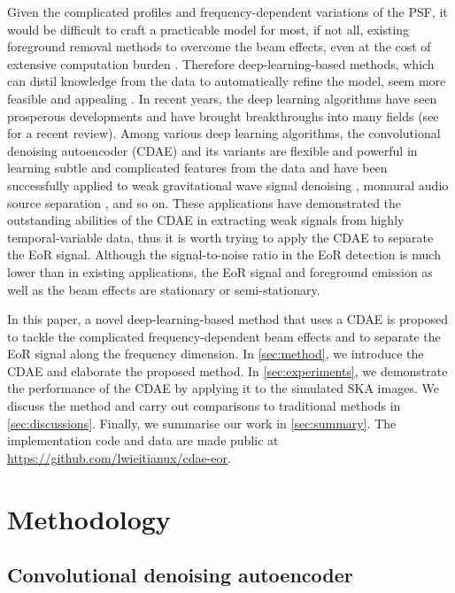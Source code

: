 \documentclass[fleqn,usenatbib]{mnras}
\newcommand{\editone}[1]{{\leavevmode\color{cyan}#1}}
\begin{document}
Given the complicated profiles and frequency-dependent variations of
the PSF, it would be difficult to craft a practicable model for most,
if not all, existing foreground removal methods to overcome the beam
effects, even at the cost of extensive computation burden
\citep[e.g.,][]{lochner2015}.
Therefore deep-learning-based methods, which can distil knowledge from
the data to automatically refine the model, seem more feasible
and appealing \citep[e.g.,][]{herbel2018,vafaeiSadr2018}.
In recent years, the deep learning algorithms have seen prosperous
developments and have brought breakthroughs into many fields
(see \citealt{lecun2015} for a recent review).
Among various deep learning algorithms, the convolutional denoising
autoencoder (CDAE) and its variants are flexible and powerful in
learning subtle and complicated features from the data and have been
successfully applied to
weak gravitational wave signal denoising \citep[e.g.,][]{shen2017},
monaural audio source separation \citep[e.g.,][]{grais2017}, and so on.
These applications have demonstrated the outstanding abilities of the
CDAE in extracting weak signals from highly temporal-variable data,
thus it is worth trying to apply the CDAE to separate the EoR signal.
Although the signal-to-noise ratio in the EoR detection is much lower
than in existing applications, the EoR signal and foreground emission
as well as the beam effects are stationary or semi-stationary.

In this paper, a novel deep-learning-based method that uses a CDAE
is proposed to tackle the complicated frequency-dependent beam effects
and to separate the EoR signal along the frequency dimension.
In \autoref{sec:method}, we introduce the CDAE and elaborate
the proposed method.
In \autoref{sec:experiments}, we demonstrate the performance of the
CDAE by applying it to the simulated SKA images.
We discuss the method and carry out
\editone{comparisons to traditional methods}
in \autoref{sec:discussions}.
Finally, we summarise our work in \autoref{sec:summary}.
The implementation code and data are made public at
\url{https://github.com/lwieitianux/cdae-eor}.


\section{Methodology}
\label{sec:method}

\subsection{Convolutional denoising autoencoder}
\label{sec:cdae}
\end{document}
